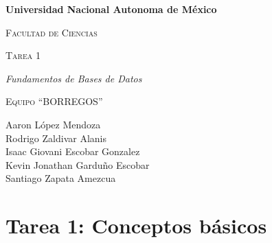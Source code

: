 \documentclass[12pt]{report}
\begin{document}
\begin{titlepage}
\centering
{\bfseries\LARGE Universidad Nacional Autonoma de M\'exico \par}
\vspace{1cm}
{\scshape\Large Facultad de Ciencias \par}
\vspace{3cm}
{\scshape\Huge Tarea 1  \par}
\vspace{3cm}
{\itshape\Large Fundamentos de Bases de Datos \par}
\vfill
{\scshape\Huge Equipo ``BORREGOS'' \par}
\vspace{3cm}
{\Large Aaron López Mendoza \\ Rodrigo Zaldivar Alanis \\ Isaac Giovani Escobar Gonzalez \\ Kevin Jonathan Garduño Escobar \\ Santiago Zapata Amezcua \par}
\vfill
\end{titlepage}
\clearpage

\setcounter{page}{1}

\section*{Tarea 1: Conceptos b\'asicos}
\end{document}
